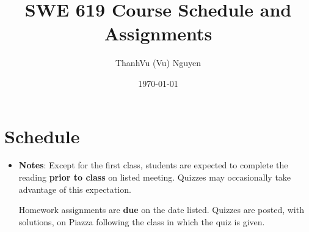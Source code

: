 \documentclass[11pt]{article}
\author{ThanhVu (Vu) Nguyen}
\date{\today}
\title{SWE 619 Course Schedule and Assignments}
\begin{document}
\maketitle
\setcounter{tocdepth}{1}
\tableofcontents


\section{Schedule}
\label{sec:org4916eff}

\begin{itemize}
\item \textbf{Notes}: Except for the first class, students are expected to complete the reading \textbf{prior to class} on listed meeting. Quizzes may occasionally take advantage of this expectation.

Homework assignments are \textbf{due} on the date listed. Quizzes are posted, with solutions, on Piazza following the class in which the quiz is given.
\end{itemize}
\end{document}
